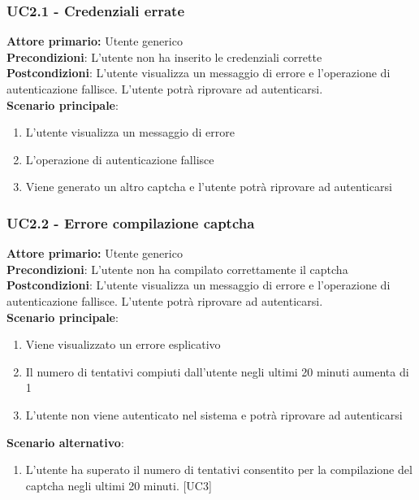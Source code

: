 \subsubsection{UC2.1 - Credenziali errate}
\textbf{Attore primario:} Utente generico\\
\textbf{Precondizioni}: L’utente non ha inserito le credenziali corrette\\
\textbf{Postcondizioni}:  L’utente visualizza un messaggio di errore e l’operazione di autenticazione fallisce. L’utente potrà riprovare  ad autenticarsi.\\

\textbf{Scenario principale}:
\begin{enumerate}
	\item L’utente visualizza un messaggio di errore
	\item L’operazione di autenticazione fallisce
	\item Viene generato un altro captcha e l’utente potrà riprovare ad autenticarsi
\end{enumerate}

\subsubsection{UC2.2 - Errore compilazione captcha}
\textbf{Attore primario:} Utente generico\\
\textbf{Precondizioni}: L’utente non ha compilato correttamente il captcha\\
\textbf{Postcondizioni}:  L’utente visualizza un messaggio di errore e l’operazione di autenticazione fallisce. L’utente potrà riprovare  ad autenticarsi.\\

\textbf{Scenario principale}:
\begin{enumerate}
	\item Viene visualizzato un errore esplicativo
	\item Il numero di tentativi compiuti dall’utente negli ultimi 20 minuti aumenta di 1
	\item L’utente non viene autenticato nel sistema e potrà  riprovare ad autenticarsi
\end{enumerate}

\textbf{Scenario alternativo}:
\begin{enumerate}
	\item L’utente ha superato il numero di tentativi consentito per la compilazione del captcha negli ultimi 20 minuti. [UC3]
\end{enumerate}

